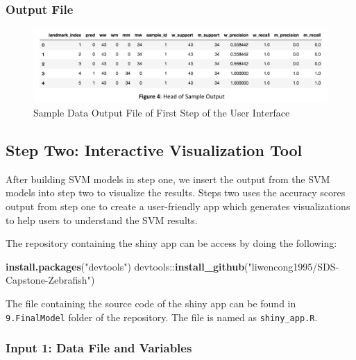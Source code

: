\documentclass[10pt,letterpaper]{article}
\newenvironment{Shaded}{\begin{snugshade}}{\end{snugshade}}
\newcommand{\KeywordTok}[1]{\textcolor[rgb]{0.13,0.29,0.53}{\textbf{{#1}}}}
\newcommand{\StringTok}[1]{\textcolor[rgb]{0.31,0.60,0.02}{{#1}}}
\newcommand{\NormalTok}[1]{{#1}}
\begin{document}
\subsubsection{Output File}\label{output-file}

\begin{figure}[h]
\includegraphics[width=5.65in]{figures/Figure4} \caption{Sample Data Output File of First Step of the User Interface}\label{fig:outputdata}
\end{figure}

\subsection{Step Two: Interactive Visualization
Tool}\label{step-two-interactive-visualization-tool}

After building SVM models in step one, we insert the output from the SVM
models into step two to visualize the results. Steps two uses the
accuracy scores output from step one to create a user-friendly app which
generates visualizations to help users to understand the SVM results.

The repository containing the shiny app can be access by doing the
following:

\begin{Shaded}
\begin{Highlighting}[]
\KeywordTok{install.packages}\NormalTok{(}\StringTok{"devtools"}\NormalTok{)}
\NormalTok{devtools::}\KeywordTok{install_github}\NormalTok{(}\StringTok{"liwencong1995/SDS-Capstone-Zebrafish"}\NormalTok{)}
\end{Highlighting}
\end{Shaded}

The file containing the source code of the shiny app can be found in
\texttt{9.FinalModel} folder of the repository. The file is named as
\texttt{shiny\_app.R}.

\subsubsection{Input 1: Data File and
Variables}\label{input-1-data-file-and-variables}
\end{document}
